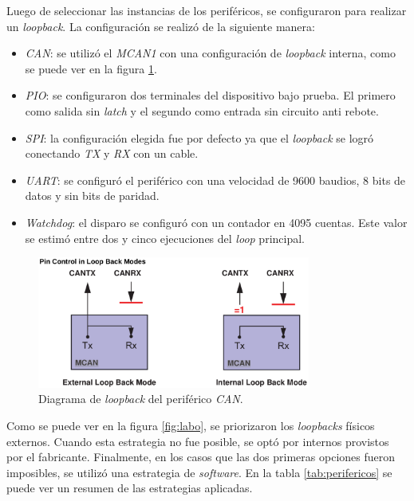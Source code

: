 Luego de seleccionar las instancias de los periféricos, se configuraron para realizar un \emph{loopback}.
La configuración se realizó de la siguiente manera:

\begin{itemize}
    \item \emph{CAN}: se utilizó el \emph{MCAN1} con una configuración de \emph{loopback} interna, como se puede ver en la figura \ref{fig:canloopback}.
    \item \emph{PIO}: se configuraron dos terminales del dispositivo bajo prueba.
        El primero como salida sin \emph{latch} y el segundo como entrada sin circuito anti rebote.
    \item \emph{SPI}: la configuración elegida fue por defecto ya que el \emph{loopback} se logró conectando \emph{TX} y \emph{RX} con un cable.
    \item \emph{UART}: se configuró el periférico con una velocidad de 9600 baudios, 8 bits de datos y sin bits de paridad.
    \item \emph{Watchdog}: el disparo se configuró con un contador en 4095 cuentas.
        Este valor se estimó entre dos y cinco ejecuciones del \emph{loop} principal.
\end{itemize}

\begin{figure}[htbp]
	\centering
	\includegraphics[width=0.8\textwidth]{./Figures/canloopback.png}
    \caption{Diagrama de \emph{loopback} del periférico \emph{CAN}\protect\footnotemark.}
	\label{fig:canloopback}
\end{figure}


Como se puede ver en la figura \ref{fig:labo}, se priorizaron los \emph{loopbacks} físicos externos.
Cuando esta estrategia no fue posible, se optó por internos provistos por el fabricante.
Finalmente, en los casos que las dos primeras opciones fueron imposibles, se utilizó una estrategia de \emph{software}.
En la tabla \ref{tab:perifericos} se puede ver un resumen de las estrategias aplicadas.

